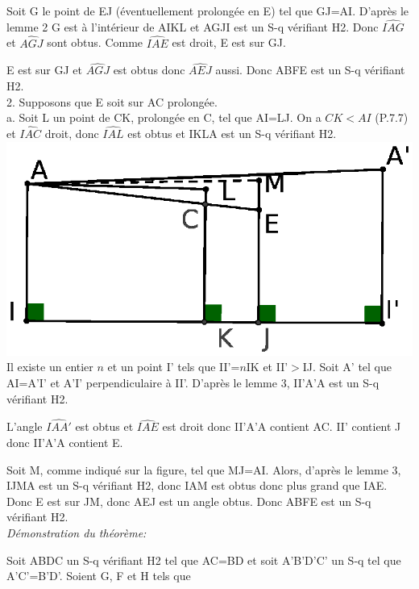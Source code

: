 \documentclass[a4paper, 12pt, twoside]{book}
\begin{document}
  Soit G le point de EJ (éventuellement prolongée en E) tel que GJ=AI. D'après le lemme 2 G est à l'intérieur de AIKL et AGJI est un S-q vérifiant H2. Donc $\hat{IAG}$ et $\hat{AGJ}$ sont obtus. Comme $\hat{IAE}$ est droit, E est sur GJ. \
  
  E est sur GJ et $\hat{AGJ}$ est obtus donc $\hat{AEJ}$ aussi. Donc ABFE est un S-q vérifiant H2.\\
  
2. Supposons que E soit sur AC prolongée.\\  
 
 
 a. Soit L un point de CK, prolongée en C, tel que AI=LJ. On a $CK<AI$ (P.7.7) et $\hat{IAC}$ droit, donc $\hat{IAL}$ est obtus et IKLA est un S-q vérifiant H2.\\
 
  \includegraphics[scale=0.7]{figures/sacc240.eps}\\
 
 Il existe un entier $n$ et un point I' tels que II'=$n$IK et II'$>$IJ. Soit A' tel que AI=A'I' et A'I' perpendiculaire à II'. D'après le lemme 3, II'A'A est un S-q vérifiant H2.\  
 
 L'angle $\hat{IAA'}$ est obtus et $\hat{IAE}$ est droit donc II'A'A contient AC. II' contient J donc II'A'A contient E.\
   
 
  
 
 Soit M, comme indiqué sur la figure, tel que MJ=AI. Alors, d'après le lemme 3, IJMA est un S-q vérifiant H2, donc IAM est obtus donc plus grand que IAE. Donc E est sur JM, donc AEJ est un angle obtus. Donc ABFE est un S-q vérifiant H2. \\
 
 
 \textit{Démonstration du théorème:}\
 
 Soit ABDC un S-q vérifiant H2 tel que AC=BD et soit A'B'D'C' un S-q tel que A'C'=B'D'. Soient G, F et H  tels que\\
 
\end{document}
